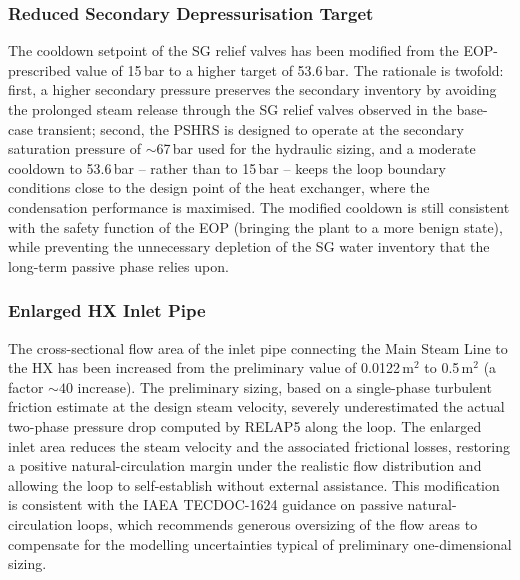 \documentclass[a4paper,11pt]{article}
\numberwithin{subsubsection}{subsection}
\numberwithin{subsection}{section}
\begin{document}
\subsubsection{Reduced Secondary Depressurisation Target}
The cooldown setpoint of the SG relief valves has been modified
from the EOP-prescribed value of 15\,bar to a higher target of
53.6\,bar. The rationale is twofold: first, a higher secondary
pressure preserves the secondary inventory by avoiding the
prolonged steam release through the SG relief valves observed in
the base-case transient; second, the
PSHRS is designed to operate at the secondary saturation pressure
of $\sim$67\,bar used for the hydraulic sizing, and a moderate
cooldown to 53.6\,bar -- rather than to 15\,bar -- keeps the loop
boundary conditions close to the design point of the heat
exchanger, where the condensation performance is maximised. The
modified cooldown is still consistent with the safety function of
the EOP (bringing the plant to a more benign state), while
preventing the unnecessary depletion of the SG water inventory
that the long-term passive phase relies upon.

\subsubsection{Enlarged HX Inlet Pipe}
The cross-sectional flow area of the inlet pipe connecting the
Main Steam Line to the HX has been increased from the preliminary
value of 0.0122\,m$^{2}$ to 0.5\,m$^{2}$ (a factor $\sim 40$
increase). The preliminary sizing, based on a single-phase
turbulent friction estimate at the design steam velocity, severely
underestimated the actual two-phase pressure drop computed by
RELAP5 along the loop. The enlarged inlet area reduces the steam
velocity and the associated frictional losses, restoring a
positive natural-circulation margin under the realistic flow
distribution and allowing the loop to self-establish without
external assistance. This modification is consistent with the IAEA
TECDOC-1624 guidance on passive natural-circulation loops, which
recommends generous oversizing of the flow areas to compensate for
the modelling uncertainties typical of preliminary one-dimensional
sizing.
\end{document}
